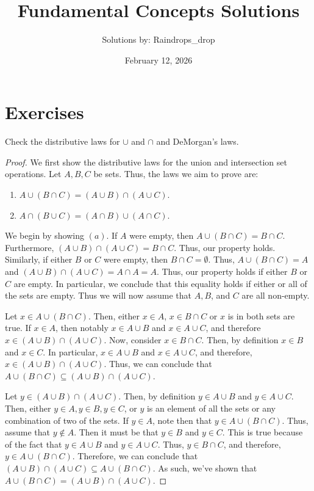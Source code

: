 \documentclass[12pt]{article}
\begin{document}

\title{Fundamental Concepts Solutions}
\author{Solutions by: Raindrops\_drop}
\date{February 12, 2026}
\maketitle

\section*{Exercises}

 Check the distributive laws for \(\cup\) and \(\cap\) and DeMorgan's laws.

\begin{proof}
	We first show the distributive laws for the union and intersection set operations.
	Let \(A, B, C\) be sets. Thus, the laws we aim to prove are:
	\begin{enumerate}
		\item[(a)] \(A \cup (B \cap C) = (A \cup B) \cap (A \cup C)\).
		\item[(b)] \(A \cap (B \cup C) = (A \cap B) \cup (A \cap C)\). 
	\end{enumerate}
	
	We begin by showing \((a)\). If \(A\) were empty, then \(A \cup (B \cap C) = B \cap C\).
	Furthermore, \((A \cup B) \cap (A \cup C) = B \cap C\). Thus, our property holds. Similarly,
	if either \(B\) or \(C\) were empty, then \(B \cap C = \emptyset\). Thus, \(A \cup (B \cap C) = A\)
	and \((A \cup B) \cap (A \cup C) = A \cap A = A\). Thus, our property holds if either \(B\) or \(C\)
	are empty. In particular, we conclude that this equality holds if either or all of the sets are 
	empty. Thus we will now assume that \(A, B\), and \(C\) are all non-empty.
	
	Let \(x \in A \cup (B \cap C)\). Then, either \(x \in A\), \(x \in B \cap C\) or \(x\) is in 
	both sets are true. If \(x \in A\), then notably \(x \in A \cup B\) and \(x \in A \cup C\),
	and therefore \(x \in (A \cup B) \cap (A \cup C)\). Now, consider \(x \in B \cap C\). Then,
	by definition \(x \in B\) and \(x \in C\). In particular, \(x \in A \cup B\) and \(x \in A \cup C\),
	and therefore, \(x \in (A \cup B) \cap (A \cup C)\). Thus, we can conclude that 
	\(A \cup (B \cap C) \subseteq (A \cup B) \cap (A \cup C)\).
	
	Let \(y \in (A \cup B) \cap (A \cup C)\). Then, by definition \(y \in A \cup B\) and 
	\(y \in A \cup C\). Then, either \(y \in A, y \in B, y \in C\), or \(y\) is an element of all the
	sets or any combination of two of the sets. If \(y \in A\), note then that \(y \in A \cup (B \cap C)\).
	Thus, assume that \(y \notin A\). Then it must be that \(y \in B\) and \(y \in C\). This is true 
	because of the fact that \(y \in A \cup B\) and \(y \in A \cup C\). Thus, \(y \in B \cap C\),
	and therefore, \(y \in A \cup (B \cap C)\). Therefore, we can conclude that 
	\((A \cup B) \cap (A \cup C) \subseteq A \cup (B \cap C)\). As such, we've shown that 
	\(A \cup (B \cap C) = (A \cup B) \cap (A \cup C)\).
	

\end{proof}
\end{document}
